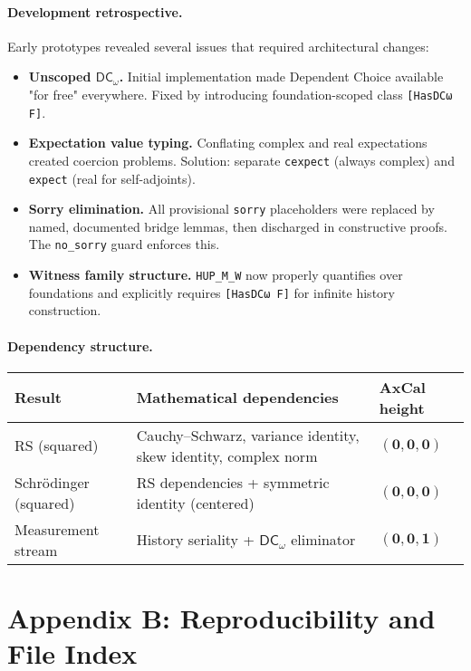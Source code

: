 \documentclass[11pt]{article}
\newcommand{\DCw}{\mathsf{DC}_{\omega}}
\newcommand{\lean}[1]{\texttt{#1}}
\theoremstyle{plain}
\theoremstyle{definition}
\theoremstyle{remark}
\begin{document}
\paragraph{Development retrospective.}
Early prototypes revealed several issues that required architectural changes:
\begin{itemize}
  \item \textbf{Unscoped $\DCw$.} Initial implementation made Dependent Choice available "for free" everywhere. Fixed by introducing foundation-scoped class \lean{[HasDCω F]}.
  \item \textbf{Expectation value typing.} Conflating complex and real expectations created coercion problems. Solution: separate \lean{cexpect} (always complex) and \lean{expect} (real for self-adjoints).
  \item \textbf{Sorry elimination.} All provisional \texttt{sorry} placeholders were replaced by named, documented bridge lemmas, then discharged in constructive proofs. The \texttt{no\_sorry} guard enforces this.
  \item \textbf{Witness family structure.} \lean{HUP\_M\_W} now properly quantifies over foundations and explicitly requires \lean{[HasDCω F]} for infinite history construction.
\end{itemize}

\paragraph{Dependency structure.}
\begin{center}
\begin{tabular}{@{}lll@{}}
\toprule
\textbf{Result} & \textbf{Mathematical dependencies} & \textbf{AxCal height} \\
\midrule
RS (squared) & Cauchy--Schwarz, variance identity, skew identity, complex norm & $(\mathbf{0},\mathbf{0},\mathbf{0})$ \\
Schrödinger (squared) & RS dependencies + symmetric identity (centered) & $(\mathbf{0},\mathbf{0},\mathbf{0})$ \\
Measurement stream & History seriality + $\DCw$ eliminator & $(\mathbf{0},\mathbf{0},\mathbf{1})$ \\
\bottomrule
\end{tabular}
\end{center}

\section*{Appendix B: Reproducibility and File Index}
\end{document}
